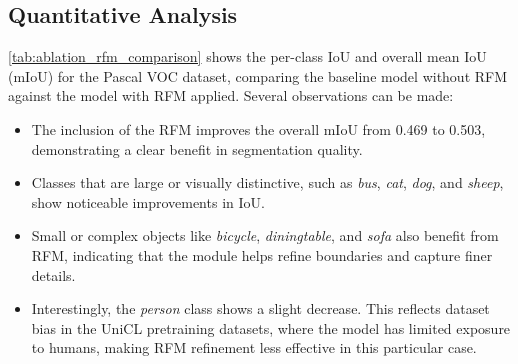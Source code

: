 \subsection{Quantitative Analysis}

\autoref{tab:ablation_rfm_comparison} shows the per-class IoU and overall mean IoU (mIoU) for the Pascal VOC dataset, comparing the baseline model without RFM against the model with RFM applied. Several observations can be made:

\begin{itemize}
    \item The inclusion of the RFM improves the overall mIoU from 0.469 to 0.503, demonstrating a clear benefit in segmentation quality.
    \item Classes that are large or visually distinctive, such as \textit{bus}, \textit{cat}, \textit{dog}, and \textit{sheep}, show noticeable improvements in IoU.
    \item Small or complex objects like \textit{bicycle}, \textit{diningtable}, and \textit{sofa} also benefit from RFM, indicating that the module helps refine boundaries and capture finer details.
    \item Interestingly, the \textit{person} class shows a slight decrease. This reflects dataset bias in the UniCL pretraining datasets, where the model has limited exposure to humans, making RFM refinement less effective in this particular case.
\end{itemize}

